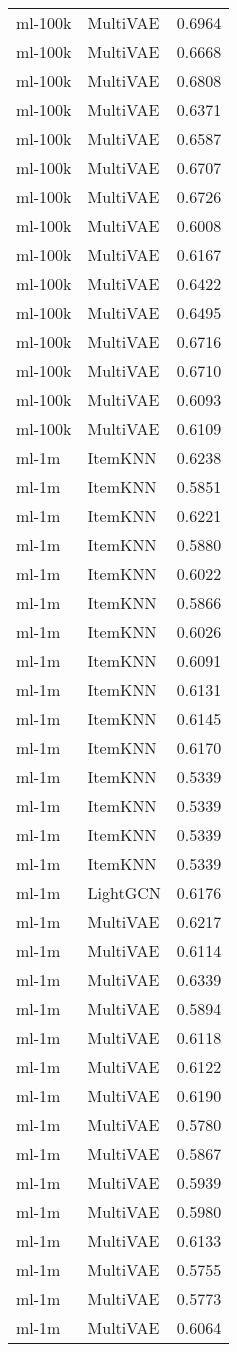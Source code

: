 \begin{table}[htbp]
\begin{tabular}{llr}
ml-100k & MultiVAE & 0.6964 \\
ml-100k & MultiVAE & 0.6668 \\
ml-100k & MultiVAE & 0.6808 \\
ml-100k & MultiVAE & 0.6371 \\
ml-100k & MultiVAE & 0.6587 \\
ml-100k & MultiVAE & 0.6707 \\
ml-100k & MultiVAE & 0.6726 \\
ml-100k & MultiVAE & 0.6008 \\
ml-100k & MultiVAE & 0.6167 \\
ml-100k & MultiVAE & 0.6422 \\
ml-100k & MultiVAE & 0.6495 \\
ml-100k & MultiVAE & 0.6716 \\
ml-100k & MultiVAE & 0.6710 \\
ml-100k & MultiVAE & 0.6093 \\
ml-100k & MultiVAE & 0.6109 \\
ml-1m & ItemKNN & 0.6238 \\
ml-1m & ItemKNN & 0.5851 \\
ml-1m & ItemKNN & 0.6221 \\
ml-1m & ItemKNN & 0.5880 \\
ml-1m & ItemKNN & 0.6022 \\
ml-1m & ItemKNN & 0.5866 \\
ml-1m & ItemKNN & 0.6026 \\
ml-1m & ItemKNN & 0.6091 \\
ml-1m & ItemKNN & 0.6131 \\
ml-1m & ItemKNN & 0.6145 \\
ml-1m & ItemKNN & 0.6170 \\
ml-1m & ItemKNN & 0.5339 \\
ml-1m & ItemKNN & 0.5339 \\
ml-1m & ItemKNN & 0.5339 \\
ml-1m & ItemKNN & 0.5339 \\
ml-1m & LightGCN & 0.6176 \\
ml-1m & MultiVAE & 0.6217 \\
ml-1m & MultiVAE & 0.6114 \\
ml-1m & MultiVAE & 0.6339 \\
ml-1m & MultiVAE & 0.5894 \\
ml-1m & MultiVAE & 0.6118 \\
ml-1m & MultiVAE & 0.6122 \\
ml-1m & MultiVAE & 0.6190 \\
ml-1m & MultiVAE & 0.5780 \\
ml-1m & MultiVAE & 0.5867 \\
ml-1m & MultiVAE & 0.5939 \\
ml-1m & MultiVAE & 0.5980 \\
ml-1m & MultiVAE & 0.6133 \\
ml-1m & MultiVAE & 0.5755 \\
ml-1m & MultiVAE & 0.5773 \\
ml-1m & MultiVAE & 0.6064 \\
\bottomrule
\end{tabular}
\end{table}